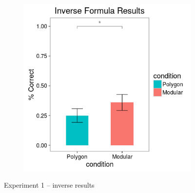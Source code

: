 \documentclass[man,mask,10pt]{apa6}
\begin{document}
\begin{figure}[H]
\begin{subfigure}[c]{0.3\textwidth}
\end{subfigure}
~
\begin{subfigure}[c]{0.3\textwidth}
\centering
\includegraphics[width=\textwidth]{figures/1/in_f_r.png}
\end{subfigure}
\caption{Experiment 1 -- inverse results}
\label{ex1_in}
\end{figure}\noindent 
\end{document}
